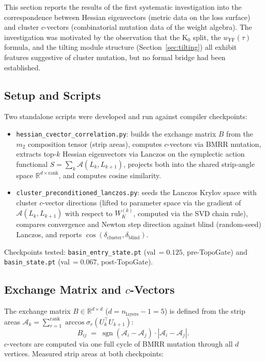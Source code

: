\documentclass[11pt]{amsart}
\begin{document}
This section reports the results of the first systematic investigation
into the correspondence between Hessian eigenvectors (metric data on the
loss surface) and cluster $c$-vectors (combinatorial mutation data of the
weight algebra).
The investigation was motivated by the observation that the K$_0$ split,
the $w_\mathrm{FF}(\tau)$ formula, and the tilting module structure
(Section~\ref{sec:tilting}) all exhibit features suggestive of cluster
mutation, but no formal bridge had been established.

\subsection{Setup and Scripts}

Two standalone scripts were developed and run against compiler checkpoints:
\begin{itemize}
\item \texttt{hessian\_cvector\_correlation.py}: builds the exchange matrix
  $B$ from the $m_2$ composition tensor (strip areas), computes $c$-vectors
  via BMRR mutation, extracts top-$k$ Hessian eigenvectors via Lanczos on
  the symplectic action functional $S = \sum_k \mathcal{A}(L_k, L_{k+1})$,
  projects both into the shared strip-angle space $\mathbb{R}^{d\times\mathrm{rank}}$,
  and computes cosine similarity.
\item \texttt{cluster\_preconditioned\_lanczos.py}: seeds the Lanczos
  Krylov space with cluster $c$-vector directions (lifted to parameter
  space via the gradient of $\mathcal{A}(L_k,L_{k+1})$ with respect to
  $W_K^{(k)}$, computed via the SVD chain rule), compares convergence
  and Newton step direction against blind (random-seed) Lanczos, and
  reports $\cos(\delta_\mathrm{cluster}, \delta_\mathrm{blind})$.
\end{itemize}
Checkpoints tested: \texttt{basin\_entry\_state.pt}
(val\,$=0.125$, pre-TopoGate) and
\texttt{basin\_state.pt} (val\,$=0.067$, post-TopoGate).

\subsection{Exchange Matrix and $c$-Vectors}

The exchange matrix $B\in\mathbb{R}^{d\times d}$
($d = n_\mathrm{layers}-1 = 5$) is defined from the strip areas
$\mathcal{A}_k = \sum_{r=1}^{\mathrm{rank}}\arccos\sigma_r(U_k^\top U_{k+1})$:
\[
  B_{ij} \;=\; \operatorname{sgn}(\mathcal{A}_i - \mathcal{A}_j)
              \cdot |\mathcal{A}_i - \mathcal{A}_j|.
\]
$c$-vectors are computed via one full cycle of BMRR mutation
through all $d$ vertices.
Measured strip areas at both checkpoints:
\end{document}
